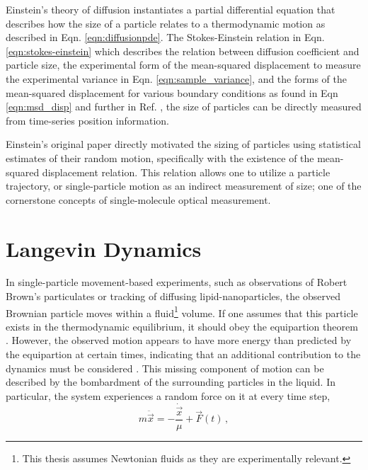 Einstein's theory of diffusion instantiates a partial differential equation that describes how the size of a particle relates to a thermodynamic motion as described in Eqn. \ref{eqn:diffusionpde}. The Stokes-Einstein relation in Eqn. \ref{eqn:stokes-einstein} which describes the relation between diffusion coefficient and particle size, the experimental form of the mean-squared displacement to measure the experimental variance in Eqn. \ref{eqn:sample_variance}, and the forms of the mean-squared displacement for various boundary conditions as found in Eqn \ref{eqn:msd_disp} and further in Ref. \cite{bickel_note_2007}, the size of particles can be directly measured from time-series position information. 

Einstein's original paper directly motivated the sizing of particles using statistical estimates of their random motion, specifically with the existence of the mean-squared displacement relation. This relation allows one to utilize a particle trajectory, or single-particle motion as an indirect measurement of size; one of the cornerstone concepts of single-molecule optical measurement.

\clearpage
\section{Langevin Dynamics}

In single-particle movement-based experiments, such as observations of Robert Brown's particulates or tracking of diffusing lipid-nanoparticles, the observed Brownian particle moves within a fluid\footnote{This thesis assumes Newtonian fluids as they are experimentally relevant.} volume. If one assumes that this particle exists in the thermodynamic equilibrium, it should obey the equipartion theorem \cite{schroeder2021thermal, pathriaStatisticalMechanics2011}. However, the observed motion appears to have more energy than predicted by the equipartion at certain times, indicating that an additional contribution to the dynamics must be considered \cite{Caspi2000EnhancedDiffusion, Mizuno2007NonequilibriumMechanics}. This missing component of motion can be described by the bombardment of the surrounding particles in the liquid. In particular, the system experiences a random force on it at every time step,
\begin{equation}\label{eqn:lg_}
	m\ddot{\vec{x}} = -\frac{\dot{\vec{x}}}{\mu} + \vec F(t)\,,
\end{equation}


